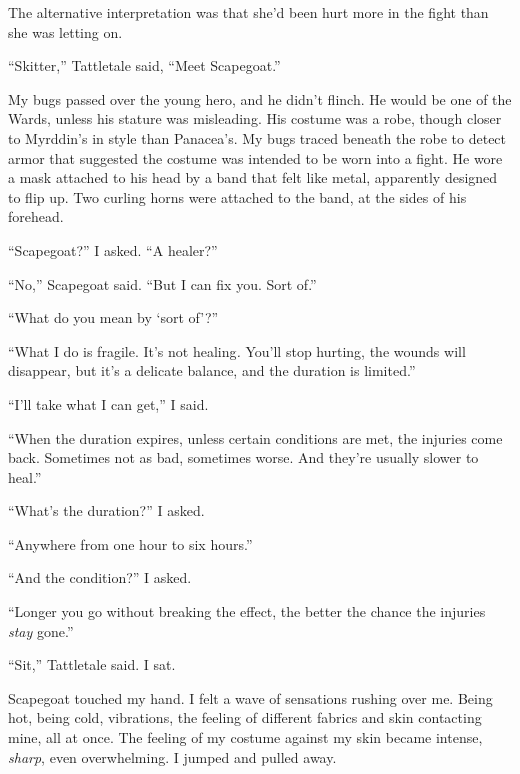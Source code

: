 The alternative interpretation was that she'd been hurt more in the fight than she was letting on.



``Skitter,'' Tattletale said, ``Meet Scapegoat.''



My bugs passed over the young hero, and he didn't flinch.  He would be one of the Wards, unless his stature was misleading.  His costume was a robe, though closer to Myrddin's in style than Panacea's.  My bugs traced beneath the robe to detect armor that suggested the costume was intended to be worn into a fight.  He wore a mask attached to his head by a band that felt like metal, apparently designed to flip up.  Two curling horns were attached to the band, at the sides of his forehead.



``Scapegoat?'' I asked.  ``A healer?''



``No,'' Scapegoat said.  ``But I can fix you.  Sort of.''



``What do you mean by `sort of'?''



``What I do is fragile.  It's not healing\emph{.  }You'll\emph{ }stop hurting, the wounds will disappear, but it's a delicate balance, and the duration is limited.''



``I'll take what I can get,'' I said.



``When the duration expires, unless certain conditions are met, the injuries come back.  Sometimes not as bad, sometimes worse.  And they're usually slower to heal.''



``What's the duration?'' I asked.



``Anywhere from one hour to six hours.''



``And the condition?''  I asked.



``Longer you go without breaking the effect, the better the chance the injuries \emph{stay} gone.''



``Sit,'' Tattletale said.  I sat.



Scapegoat touched my hand.  I felt a wave of sensations rushing over me.  Being hot, being cold, vibrations, the feeling of different fabrics and skin contacting mine, all at once.  The feeling of my costume against my skin became intense, \emph{sharp}, even overwhelming.  I jumped and pulled away.



